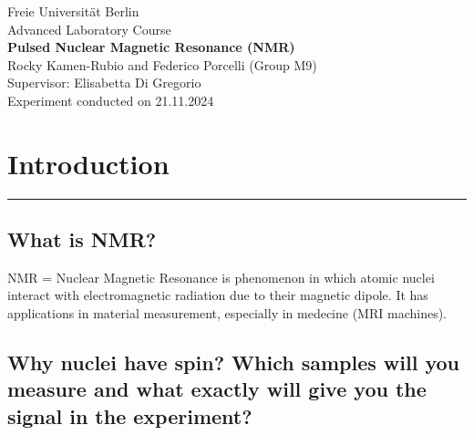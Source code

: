 \documentclass[12pt]{article}
\begin{document}
\begin{center}
\huge{Freie Universität Berlin}\\[10pt]
\huge{Advanced Laboratory Course}\\[50pt]
\huge{\textbf{Pulsed Nuclear Magnetic Resonance (NMR)}}\\[60pt]
\large{Rocky Kamen-Rubio and Federico Porcelli (Group M9)}\\[30pt]
\large{Supervisor: Elisabetta Di Gregorio}\\[30pt]
\large{Experiment conducted on 21.11.2024}\\[30pt]
\end{center}

\begin{abstract}
\justifying (insert abstract)
\end{abstract}

\tableofcontents

\section{Introduction}
\rule{\textwidth}{0.5pt}
\justifying

%
%
%
%
%
%
%
\subsection{What is NMR?}

NMR = Nuclear Magnetic Resonance is phenomenon in which atomic nuclei interact with electromagnetic radiation due to their magnetic dipole. It has applications in material measurement, especially in medecine (MRI machines).


\subsection{Why nuclei have spin? Which samples will you measure and what exactly will give you the signal in the experiment?}
\end{document}
